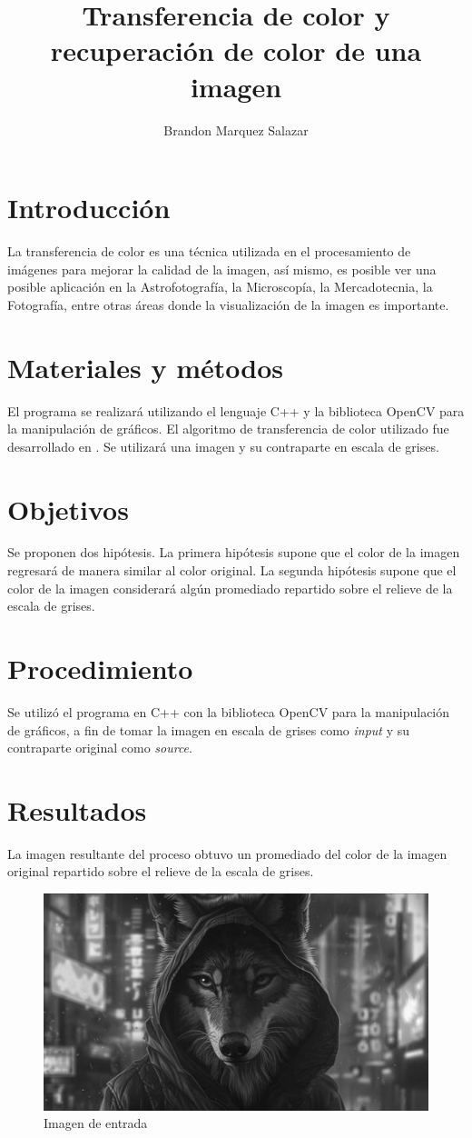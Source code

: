 \documentclass[10pt]{IEEEtran}
\title{Transferencia de color y recuperación de color de una imagen}
\author{ Brandon Marquez Salazar }
\begin{document}
  \maketitle
  \section{Introducción}
  La transferencia de color es una técnica utilizada en el procesamiento de imágenes para mejorar
  la calidad de la imagen, así mismo, es posible ver una posible aplicación en la Astrofotografía,
  la Microscopía, la Mercadotecnia, la Fotografía, entre otras áreas donde la visualización de la imagen es importante.

  \section{Materiales y métodos}
  El programa se realizará utilizando el lenguaje C++ y la biblioteca OpenCV para la manipulación de gráficos.
  El algoritmo de transferencia de color utilizado fue desarrollado en \cite{Reinhard2001}.
  Se utilizará una imagen y su contraparte en escala de grises.

  \section{Objetivos}
  Se proponen dos hipótesis.
  La primera hipótesis supone que el color de la imagen regresará de manera similar al color original.
  La segunda hipótesis supone que el color de la imagen considerará algún promediado repartido sobre el relieve de la escala de grises.

  \section{Procedimiento}
  Se utilizó el programa en C++ con la biblioteca OpenCV para la manipulación de gráficos, a fin de
  tomar la imagen en escala de grises como \textit{input} y su contraparte original como \textit{source}.

  \section{Resultados}
  La imagen resultante del proceso obtuvo un promediado del color de la imagen original repartido
  sobre el relieve de la escala de grises.

    \begin{figure}[ht]
      \centering
      \includegraphics[width=0.8\linewidth]{res/Original.png}
      \caption{Imagen de entrada}
    \end{figure}
\end{document}
